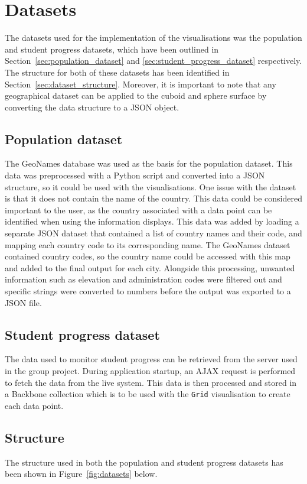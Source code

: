 \section{Datasets} {
\label{sec:datasets}

	The datasets used for the implementation of the visualisations was the population and student progress datasets, which have been outlined in Section~\ref{sec:population_dataset} and \ref{sec:student_progress_dataset} respectively. The structure for both of these datasets has been identified in Section~\ref{sec:dataset_structure}. Moreover, it is important to note that any geographical dataset can be applied to the cuboid and sphere surface by converting the data structure to a JSON object.

	\subsection{Population dataset} {
	\label{sec:population_dataset}

		The GeoNames database was used as the basis for the population dataset. This data was preprocessed with a Python script and converted into a JSON structure, so it could be used with the visualisations. One issue with the dataset is that it does not contain the name of the country. This data could be considered important to the user, as the country associated with a data point can be identified when using the information displays. This data was added by loading a separate JSON dataset that contained a list of country names and their code, and mapping each country code to its corresponding name. The GeoNames dataset contained country codes, so the country name could be accessed with this map and added to the final output for each city. Alongside this processing, unwanted information such as elevation and administration codes were filtered out and specific strings were converted to numbers before the output was exported to a JSON file.

	}

	\subsection{Student progress dataset} {
	\label{sec:student_progress_dataset}

		The data used to monitor student progress can be retrieved from the server used in the group project. During application startup, an AJAX request is performed to fetch the data from the live system. This data is then processed and stored in a Backbone collection which is to be used with the \texttt{Grid} visualisation to create each data point.

	}

	\subsection{Structure} {
	\label{sec:dataset_structure}

		The structure used in both the population and student progress datasets has been shown in Figure~\ref{fig:datasets} below.

		

	}

}

